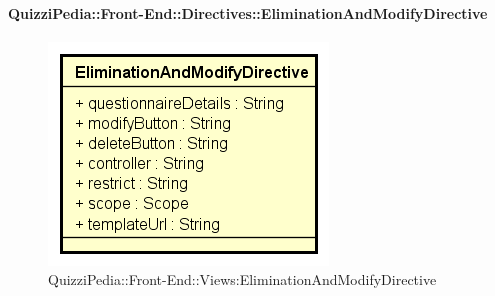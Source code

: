 \paragraph{QuizziPedia::Front-End::Directives::EliminationAndModifyDirective}
\begin{figure} [ht]
	\centering
	\includegraphics[scale=0.80]{UML/Classi/Front-End/QuizziPedia_Front-end_EliminationAndModifyDirective.png}
	\caption{QuizziPedia::Front-End::Views:EliminationAndModifyDirective}
\end{figure} \FloatBarrier

